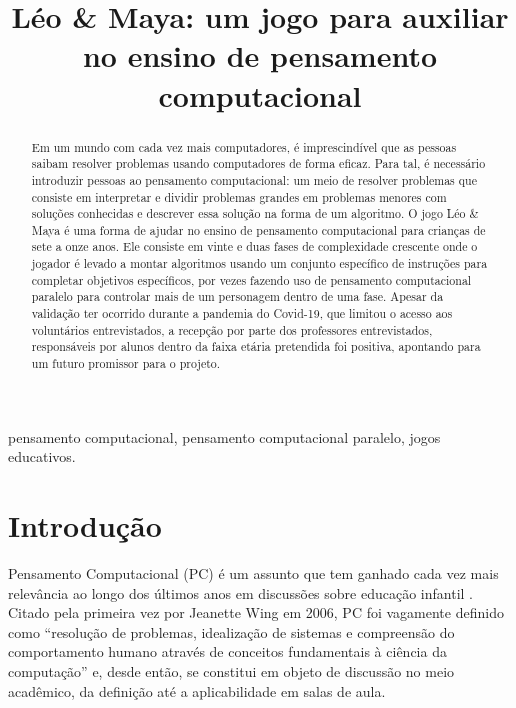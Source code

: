 \documentclass[conference]{IEEEtran}
\begin{document}
\title{Léo \& Maya: um jogo para auxiliar no ensino de pensamento computacional
}


%

\maketitle

\begin{abstract}
Em um mundo com cada vez mais computadores, é imprescindível que as pessoas saibam resolver problemas usando computadores de forma eficaz. Para tal, é necessário introduzir pessoas ao pensamento computacional: um meio de resolver problemas que consiste em interpretar e dividir problemas grandes em problemas menores com soluções conhecidas e descrever essa solução na forma de um algoritmo. O jogo Léo \& Maya é uma forma de ajudar no ensino de pensamento computacional para crianças de sete a onze anos. Ele consiste em vinte e duas fases de complexidade crescente onde o jogador é levado a montar algoritmos usando um conjunto específico de instruções para completar objetivos específicos, por vezes fazendo uso de pensamento computacional paralelo para controlar mais de um personagem dentro de uma fase. Apesar da validação ter ocorrido durante a pandemia do Covid-19, que limitou o acesso aos voluntários entrevistados, a recepção por parte dos professores entrevistados, responsáveis por alunos dentro da faixa etária pretendida foi positiva, apontando para um futuro promissor para o projeto.
\end{abstract}

\renewcommand{\IEEEkeywordsname}{Palavras-Chave}
\begin{IEEEkeywords}
pensamento computacional, pensamento computacional paralelo, jogos educativos.
\end{IEEEkeywords}

\section{Introdução}

Pensamento Computacional (PC) é um assunto que tem ganhado cada vez mais relevância ao longo dos últimos anos em discussões sobre educação infantil \cite{b1}. Citado pela primeira vez por Jeanette Wing em 2006, PC foi vagamente definido como ``resolução de problemas, idealização de sistemas e compreensão do comportamento humano através de conceitos fundamentais à ciência da computação''\cite{b2} e, desde então, se constitui em objeto de discussão no meio acadêmico, da definição até a aplicabilidade em salas de aula.
\end{document}
